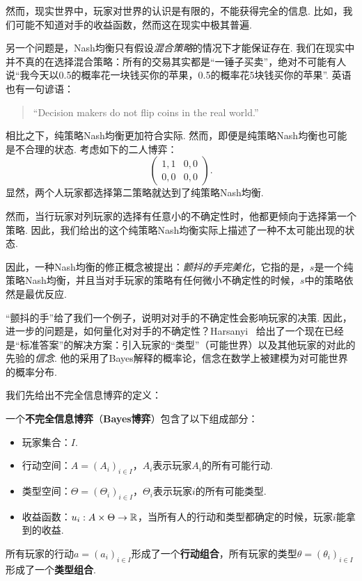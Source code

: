 然而，现实世界中，玩家对世界的认识是有限的，不能获得完全的信息. 比如，我们可能不知道对手的收益函数，然而这在现实中极其普遍. 

另一个问题是，Nash均衡只有假设\textit{混合策略}的情况下才能保证存在. 我们在现实中并不真的在选择混合策略：所有的交易其实都是“一锤子买卖”，绝对不可能有人说“我今天以0.5的概率花一块钱买你的苹果，0.5的概率花5块钱买你的苹果”. 英语也有一句谚语：
\begin{quotation}
“Decision makers do not flip coins in the real world.”
\end{quotation}

相比之下，纯策略Nash均衡更加符合实际. 然而，即便是纯策略Nash均衡也可能是不合理的状态. 考虑如下的二人博弈：
\[\begin{pmatrix}
1,1&0,0\\
0,0&0,0
\end{pmatrix}.\]
显然，两个人玩家都选择第二策略就达到了纯策略Nash均衡.

然而，当行玩家对列玩家的选择有任意小的不确定性时，他都更倾向于选择第一个策略. 因此，我们给出的这个纯策略Nash均衡实际上描述了一种不太可能出现的状态.

因此，一种Nash均衡的修正概念被提出：\textit{颤抖的手完美化}，它指的是，$s$是一个纯策略Nash均衡，并且当对手玩家的策略有任何微小不确定性的时候，$s$中的策略依然是最优反应.

“颤抖的手”给了我们一个例子，说明对对手的不确定性会影响玩家的决策. 因此，进一步的问题是，如何量化对对手的不确定性？Harsanyi~\cite{harsanyiGamesIncompleteInformation1967,harsanyiGamesIncompleteInformation1968,harsanyiGamesIncompleteInformation1968a} 给出了一个现在已经是“标准答案”的解决方案：引入玩家的“类型”（可能世界）以及其他玩家的对此的先验的\textit{信念}. 他的采用了Bayes解释的概率论，信念在数学上被建模为对可能世界的概率分布.

我们先给出不完全信息博弈的定义：

\begin{definition}
    一个\textbf{不完全信息博弈}（\textbf{Bayes博弈}）包含了以下组成部分：
\begin{itemize}
    \item 玩家集合：$I$.
    \item 行动空间：$A=(A_i)_{i\in I}$，$A_i$表示玩家$A_i$的所有可能行动.
    \item 类型空间：$\Theta=(\Theta_i)_{i\in I}$，$\Theta_i$表示玩家$i$的所有可能类型.
    \item 收益函数：$u_i:A\times\Theta\to\mathbb{R}$，当所有人的行动和类型都确定的时候，玩家$i$能拿到的收益.
\end{itemize}
所有玩家的行动$a=(a_i)_{i\in I}$形成了一个\textbf{行动组合}，所有玩家的类型$\theta=(\theta_i)_{i\in I}$形成了一个\textbf{类型组合}.
\end{definition}

